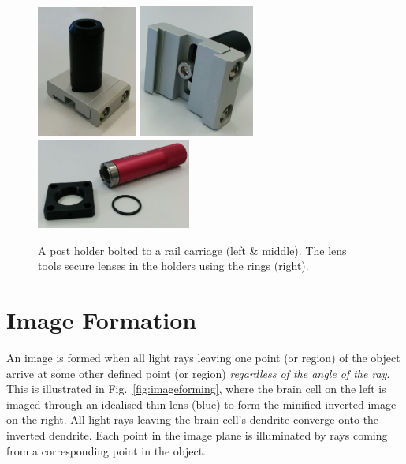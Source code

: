 \documentclass[a4paper]{report}
\begin{document}
\begin{figure}[h]
\center
\includegraphics[width=1.3in]{post_mounted.eps}
\includegraphics[width=1.5in]{post_mounted_underside.eps}
\includegraphics[width=2in]{lens_tool.eps}
\caption{A post holder bolted to a rail carriage (left \& middle).
The lens tools secure lenses in the holders using the rings (right).}
\label{fig:post}
\end{figure}


\clearpage

\section{Image Formation}
An image is formed when all light rays leaving one point (or region) of the object arrive at some other defined point (or region) \textit{regardless of the angle of the ray}. 
This is illustrated in Fig.~\ref{fig:imageforming}, where the brain cell on the left is imaged through an idealised thin lens (blue) to form the minified inverted image on the right. 
All light rays leaving the brain cell's dendrite converge onto the inverted dendrite. 
Each point in the image plane is illuminated by rays coming from a corresponding point in the object. 
\end{document}
